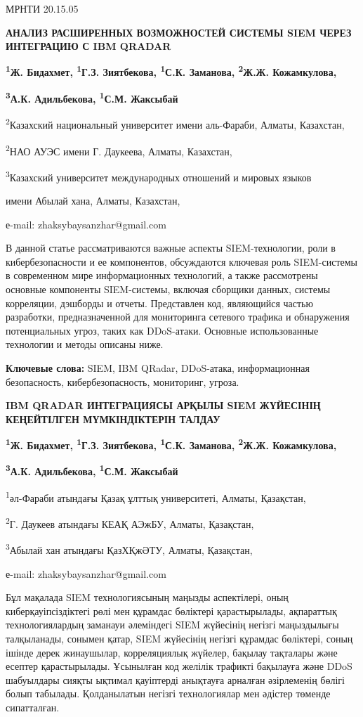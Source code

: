 МРНТИ 20.15.05

\textbf{АНАЛИЗ РАСШИРЕННЫХ ВОЗМОЖНОСТЕЙ СИСТЕМЫ SIEM ЧЕРЕЗ ИНТЕГРАЦИЮ С
IBM QRADAR}

\textbf{\textsuperscript{1}Ж. Бидахмет, \textsuperscript{1}Г.З.
Зиятбекова, \textsuperscript{1}С.К. Заманова, \textsuperscript{2}Ж.Ж.
Кожамкулова,}

\textbf{\textsuperscript{3}А.К. Адильбекова, \textsuperscript{1}С.М.
Жаксыбай}

\textsuperscript{2}Казахский национальный университет имени аль-Фараби,
Алматы, Казахстан,

\textsuperscript{2}НАО АУЭС имени Г. Даукеева, Алматы, Казахстан,

\textsuperscript{3}Казахский университет международных отношений и
мировых языков

имени Абылай хана, Алматы, Казахстан,

е-mail: zhaksybaysanzhar@gmail.com

В данной статье рассматриваются важные аспекты SIEM-технологии, роли в
кибербезопасности и ее компонентов, обсуждаются ключевая роль
SIEM-системы в современном мире информационных технологий, а также
рассмотрены основные компоненты SIEM-системы, включая сборщики данных,
системы корреляции, дэшборды и отчеты. Представлен код, являющийся
частью разработки, предназначенной для мониторинга сетевого трафика и
обнаружения потенциальных угроз, таких как DDoS-атаки. Основные
использованные технологии и методы описаны ниже.

\textbf{Ключевые слова:} SIEM, IBM QRadar, DDoS-атака, информационная
безопасность, кибербезопасность, мониторинг, угроза.

\textbf{IBM QRADAR ИНТЕГРАЦИЯСЫ АРҚЫЛЫ SIEM ЖҮЙЕСІНІҢ КЕҢЕЙТІЛГЕН
МҮМКІНДІКТЕРІН ТАЛДАУ}

\textbf{\textsuperscript{1}Ж. Бидахмет, \textsuperscript{1}Г.З.
Зиятбекова, \textsuperscript{1}С.К. Заманова, \textsuperscript{2}Ж.Ж.
Кожамкулова,}

\textbf{\textsuperscript{3}А.К. Адильбекова, \textsuperscript{1}С.М.
Жаксыбай}

\textsuperscript{1}әл-Фараби атындағы Қазақ ұлттық университеті, Алматы,
Қазақстан,

\textsuperscript{2}Г. Даукеев атындағы КЕАҚ АЭжБУ, Алматы, Қазақстан,

\textsuperscript{3}Абылай хан атындағы ҚазХҚжӘТУ, Алматы, Қазақстан,

е-mail: zhaksybaysanzhar@gmail.com

Бұл мақалада SIEM технологиясының маңызды аспектілері, оның
киберқауіпсіздіктегі рөлі мен құрамдас бөліктері қарастырылады,
ақпараттық технологиялардың заманауи әлеміндегі SIEM жүйесінің негізгі
маңыздылығы талқыланады, сонымен қатар, SIEM жүйесінің негізгі құрамдас
бөліктері, соның ішінде дерек жинаушылар, корреляциялық жүйелер, бақылау
тақталары және есептер қарастырылады. Ұсынылған код желілік трафикті
бақылауға және DDoS шабуылдары сияқты ықтимал қауіптерді анықтауға
арналған әзірлеменің бөлігі болып табылады. Қолданылатын негізгі
технологиялар мен әдістер төменде сипатталған.

